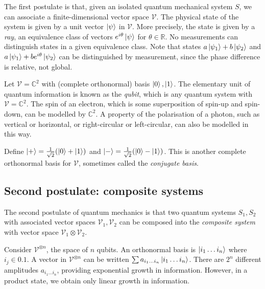 The first postulate is that, given an isolated quantum mechanical system \( S \), we can associate a finite-dimensional vector space \( \mathcal V \).
The physical state of the system is given by a unit vector \( \ket{\psi} \) in \( \mathcal V \).
More precisely, the state is given by a \emph{ray}, an equivalence class of vectors \( e^{i\theta} \ket{\psi} \) for \( \theta \in \mathbb R \).
No measurements can distinguish states in a given equivalence class.
Note that states \( a\ket{\psi_1} + b\ket{\psi_2} \) and \( a\ket{\psi_1} + be^{i\theta}\ket{\psi_2} \) can be distinguished by measurement, since the phase difference is relative, not global.
\begin{example}
    Let \( \mathcal V = \mathbb C^2 \) with (complete orthonormal) basis \( \ket{0}, \ket{1} \).
    The elementary unit of quantum information is known as the \emph{qubit}, which is any quantum system with \( \mathcal V = \mathbb C^2 \).
    The spin of an electron, which is some superposition of spin-up and spin-down, can be modelled by \( \mathbb C^2 \).
    A property of the polarisation of a photon, such as vertical or horizontal, or right-circular or left-circular, can also be modelled in this way.

    Define \( \ket{+} = \frac{1}{\sqrt{2}}\qty(\ket{0} + \ket{1}) \) and \( \ket{-} = \frac{1}{\sqrt{2}}\qty(\ket{0} - \ket{1}) \).
    This is another complete orthonormal basis for \( \mathcal V \), sometimes called the \emph{conjugate basis}.
\end{example}

\subsection{Second postulate: composite systems}
The second postulate of quantum mechanics is that two quantum systems \( S_1, S_2 \) with associated vector spaces \( \mathcal V_1, \mathcal V_2 \) can be composed into the \emph{composite system} with vector space \( \mathcal V_1 \otimes \mathcal V_2 \).
\begin{example}
    Consider \( \mathcal V^{\otimes n} \), the space of \( n \) qubits.
    An orthonormal basis is \( \ket{i_1 \dots i_n} \) where \( i_j \in \qty{0,1} \).
    A vector in \( \mathcal V^{\otimes n} \) can be written \( \sum a_{i_1 \dots i_n} \ket{i_1 \dots i_n} \).
    There are \( 2^n \) different amplitudes \( a_{i_1 \dots i_n} \), providing exponential growth in information.
    However, in a product state, we obtain only linear growth in information.
\end{example}

